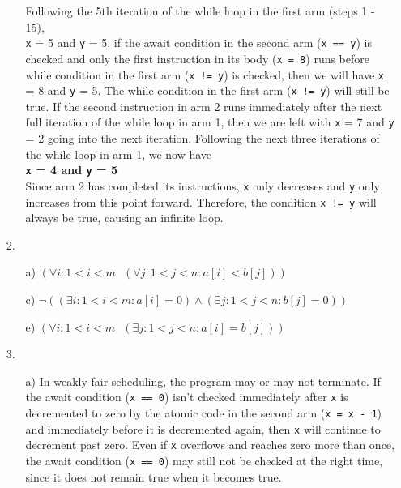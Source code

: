 \documentclass[11pt]{article}
\newcommand{\code}[1]{\texttt{#1}}
\begin{document}
\begin{enumerate}
\begin{enumerate}
	\hspace{0.8cm} Following the 5th iteration of the while loop in the first arm (steps 1 - 15),\\
	\code{x} = 5 and \code{y} = 5. if the await condition in the second arm (\code{x == y}) is checked and only the first instruction in its body (\code{x = 8}) runs before while condition in the first arm (\code{x != y}) is checked, then we will have \code{x} = 8 and \code{y} = 5. The while condition in the first arm (\code{x != y}) will still be true. If the second instruction in arm 2 runs immediately after the next full iteration of the while loop in arm 1, then  we are left with \code{x} = 7 and \code{y} = 2 going into the next iteration. Following the next three iterations of the while loop in arm 1, we now have \\ 
	\textbf{\code{x} = 4 and \code{y} = 5} \\
	Since arm 2 has completed its instructions, \code{x} only decreases and \code{y} only increases from this point forward. Therefore, the condition \code{x != y} will always be true, causing an infinite loop.\\


	
	\end{enumerate}
	
\newpage

\item [2.] 

	\begin{enumerate}
	\item[a)] $(\forall i : 1 < i < m \text{ } (\forall j : 1 < j < n : a[i] < b[j]))$ 
	
	\item[c)] $\lnot ((\exists i :  1 < i < m : a[i] = 0) \land (\exists j :  1 < j < n : b[j] = 0))$
	
	\item[e)] $(\forall i : 1 < i < m \text{ } (\exists j : 1 < j < n : a[i] = b[j]))$ 
	
	\end{enumerate}
	
\item [3.] 

	\begin{enumerate}
	\item[a)] \hspace{0.8cm}In weakly fair scheduling, the program may or may not terminate. If the await condition (\code{x == 0}) isn't checked immediately after \code{x} is decremented to zero by the atomic code in the second arm (\code{x = x - 1}) and immediately before it is decremented again, then \code{x} will continue to decrement past zero. Even if \code{x} overflows and reaches zero more than once, the await condition (\code{x == 0}) may still not be checked at the right time, since it does not remain true when it becomes true.
	

\end{enumerate}
\end{enumerate}
\end{document}
